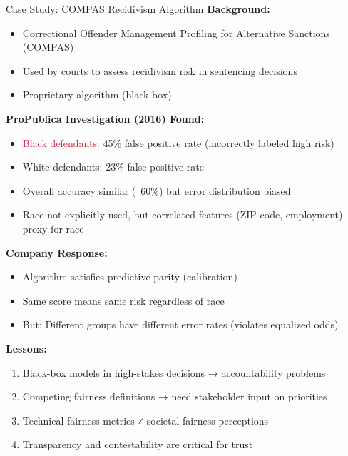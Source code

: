 \begin{frame}{Case Study: COMPAS Recidivism Algorithm}
\textbf{Background:}
\begin{itemize}
\item Correctional Offender Management Profiling for Alternative Sanctions (COMPAS)
\item Used by courts to assess recidivism risk in sentencing decisions
\item Proprietary algorithm (black box)
\end{itemize}

\vspace{0.2cm}
\textbf{ProPublica Investigation (2016) Found:}
\begin{itemize}
\item \textcolor{crimson}{Black defendants:} 45\% false positive rate (incorrectly labeled high risk)
\item \textcolor{forest}{White defendants:} 23\% false positive rate
\item Overall accuracy similar (~60\%) but error distribution biased
\item Race not explicitly used, but correlated features (ZIP code, employment) proxy for race
\end{itemize}

\vspace{0.2cm}
\textbf{Company Response:}
\begin{itemize}
\item Algorithm satisfies predictive parity (calibration)
\item Same score means same risk regardless of race
\item But: Different groups have different error rates (violates equalized odds)
\end{itemize}

\vspace{0.2cm}
\textbf{Lessons:}
\begin{enumerate}
\item Black-box models in high-stakes decisions → accountability problems
\item Competing fairness definitions → need stakeholder input on priorities
\item Technical fairness metrics ≠ societal fairness perceptions
\item Transparency and contestability are critical for trust
\end{enumerate}
\end{frame}

